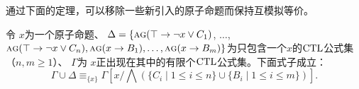 
通过下面的定理，可以移除一些新引入的原子命题而保持互模拟等价。

\begin{lemma} \label{thm:Aclm}
	令 $x$为一个原子命题、
	$\Delta = \{\textsc{a}\textsc{g}(\top \rightarrow \neg x \vee C_1)$, $\dots$, $\textsc{a}\textsc{g}(\top \rightarrow \neg x \vee C_n), \textsc{a}\textsc{g}(x \rightarrow B_1), \dots, \textsc{a}\textsc{g}(x \rightarrow B_m)\}$为只包含一个$x$的$\textrm{CTL}$公式集（$n, m \geq 1$）、
	$\Gamma$为 $x$正出现在其中的有限个$\textrm{CTL}$公式集。下面式子成立：
	\begin{equation}\label{eq:Ackermann:lemma}
		\Gamma\cup \Delta \equiv_{\{x\}}
		\Gamma\left[x/\bigwedge\left(\{C_i\mid 1\le i\le n\}\cup\{B_i\mid 1\le i\le m\}\right)\right].
	\end{equation}
\end{lemma}
